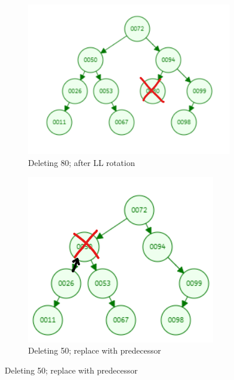 \documentclass[12pt, a4paper]{article}
\begin{document}
\begin{enumerate}
\begin{enumerate}
\begin{figure}[h!]
\begin{subfigure}[b]{0.3\textwidth}
        \end{subfigure}
        \hfill
        \begin{subfigure}[b]{0.3\textwidth}
          \centering
          \includegraphics[width=\textwidth]{2-2-c}
          \caption{Deleting 80; after LL rotation}
          \label{fig:2-2-c}
        \end{subfigure}
        \hfill
        \begin{subfigure}[b]{0.3\textwidth}
          \centering
          \includegraphics[width=\textwidth]{2-2-d}
          \caption{Deleting 50; replace with predecessor}

\end{subfigure}
\end{figure}
\end{enumerate}
\end{enumerate}
\end{document}
